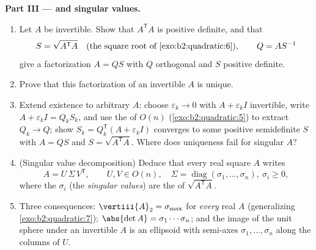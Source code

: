 \begin{problem}
\medskip
\noindent\textbf{Part III ---  and singular
values.}
\begin{enumerate}[resume]
  \item Let $A$ be invertible. Show that $A^{\mathsf T}A$ is
        positive definite, and that
        \[
        S = \sqrt{A^{\mathsf T}A}
        \quad\text{(the square root of
        \cref{exo:b2:quadratic:6})},
        \qquad Q = AS^{-1}
        \]
        give a factorization $A = QS$ with $Q$ orthogonal and
        $S$ positive definite.
  \item Prove that this factorization of an invertible $A$ is
        unique.
  \item Extend existence to arbitrary $A$: choose
        $\varepsilon_k \to 0$ with $A + \varepsilon_k I$
        invertible, write $A + \varepsilon_kI = Q_kS_k$, and
        use the  of $O(n)$
        (\cref{exo:b2:quadratic:5}) to extract $Q_k \to Q$;
        show $S_k = Q_k^{\mathsf T}(A + \varepsilon_kI)$
        converges to some positive semidefinite $S$ with $A =
        QS$ and $S = \sqrt{A^{\mathsf T}A}$. Where does
        uniqueness fail for singular $A$?
  \item (Singular value decomposition) Deduce that every real
        square $A$ writes
        \[
        A = U\,\Sigma\,V^{\mathsf T},
        \qquad U, V \in O(n),\quad
        \Sigma = \operatorname{diag}(\sigma_1, \dots,
        \sigma_n),\ \sigma_i \geq 0 ,
        \]
        where the $\sigma_i$ (the \emph{singular values}) are
        the  of $\sqrt{A^{\mathsf T}A}$.
  \item Three consequences: $\vertiii{A}_2 = \sigma_{\max}$ for
        \emph{every} real $A$ (generalizing
        \cref{exo:b2:quadratic:7}); $\abs{\det A} =
        \sigma_1\cdots\sigma_n$; and the image of the unit
        sphere under an invertible $A$ is an ellipsoid with
        semi-axes $\sigma_1, \dots, \sigma_n$ along the columns
        of $U$.
\end{enumerate}


\end{problem}
